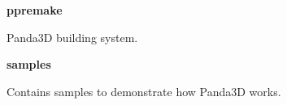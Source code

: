 \documentclass[a4paper]{article}
\begin{document}
\bigskip


\bigskip

{\centering\sffamily\bfseries
\hypertarget{RefHeading23571167907073}{}ppremake
\par}

{\centering\color{black}
Panda3D building system.
\par}

\clearpage
\bigskip

\clearpage
\bigskip


\bigskip


\bigskip

{\centering\sffamily\bfseries
\hypertarget{RefHeading23591167907073}{}samples
\par}

{\centering\color{black}
Contains samples to demonstrate how Panda3D works.
\par}
\end{document}
